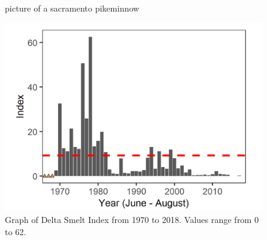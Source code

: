 \documentclass[
]{book}
\begin{document}
\begin{panel-grid}
\begin{columns-nocenter}
\begin{column800}
\begin{figure}
{}

\caption{picture of a sacramento pikeminnow}\label{fig:unnamed-chunk-78}
\end{figure}

\end{column800}

\end{columns-nocenter}

\begin{columns-nocenter}

\begin{column800}

\begin{expand}

\begin{figure}
\includegraphics[width=15.25in]{figures/STN_DSM} \caption{Graph of Delta Smelt Index from 1970 to 2018. Values range from 0 to 62.}\label{fig:unnamed-chunk-79}
\end{figure}

\end{expand}

\end{column800}

\begin{column40}

~

\end{column40}

\begin{column800}

\begin{expand}


\end{expand}
\end{column800}
\end{columns-nocenter}
\end{panel-grid}
\end{document}
